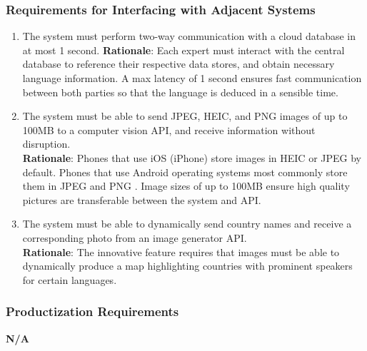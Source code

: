 \subsubsection{Requirements for Interfacing with Adjacent Systems}
\label{ssub:requirements_for_interfacing_with_adjacent_systems}
\begin{enumerate}[{OE-IA}1.]
	\item The system must perform two-way communication with a cloud database in at most 1 second.
	\textbf{Rationale}: Each expert must interact with the central database to reference their respective data stores, and obtain necessary language information. A max latency of 1 second ensures fast communication between both parties so that the language is deduced in a sensible time.   
	\item The system must be able to send JPEG, HEIC, and PNG images of up to 100MB to a computer vision API, and receive information without disruption.
	\\ \textbf{Rationale}: Phones that use iOS (iPhone) store images in HEIC or JPEG by default. Phones that use Android operating systems most commonly store them in JPEG and PNG \cite{7}. Image sizes of up to 100MB ensure high quality pictures are transferable between the system and API.
	\item The system must be able to dynamically send country names and receive a corresponding photo from an image generator API.
	\\ \textbf{Rationale}: The innovative feature requires that images must be able to dynamically produce a map highlighting countries with prominent speakers for certain languages.
\end{enumerate}

\subsubsection{Productization Requirements}
\label{ssub:productization_requirements}
\textbf{N/A}

